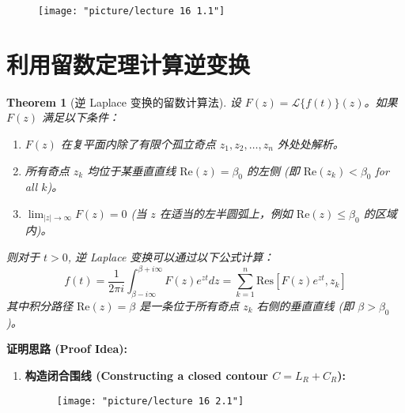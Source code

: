 \documentclass[linespread=1.5,openany]{book}%
\def\diff{d}%
\theoremstyle{plain}
\newtheorem{theorem}{Theorem}
\newcommand{\diff}{\mathop{}\!\mathrm{d}}  %
\begin{document}
{{{{{{{									\begin{figure}[h]
										\centering
										\texttt{[image: "picture/lecture 16 1.1"]}
										\caption{}
										\label{fig:lecture-16-1.1}
									\end{figure}
									
									
									
								} %
								
								
								
								
								
								
								\section{利用留数定理计算逆变换}
								{ %
									\begin{theorem}[逆 Laplace 变换的留数计算法] \label{thm:L16_inverse_laplace_residue_revised}
										设 $F(z) = \mathcal{L}\{f(t)\}(z)$。如果 $F(z)$ 满足以下条件：
										\begin{enumerate}
											\item $F(z)$ 在复平面内除了有限个孤立奇点 $z_1, z_2, \dots, z_n$ 外处处解析。
											\item 所有奇点 $z_k$ 均位于某垂直直线 $\text{Re}(z) = \beta_0$ 的左侧 (即 $\text{Re}(z_k) < \beta_0$ for all $k$)。
											\item $\lim_{|z|\to\infty} F(z) = 0$ (当 $z$ 在适当的左半圆弧上，例如 $\text{Re}(z) \le \beta_0$ 的区域内)。
										\end{enumerate}
										则对于 $t>0$, 逆 Laplace 变换可以通过以下公式计算：
										\[ f(t) = \frac{1}{2\pi i} \int_{\beta-i\infty}^{\beta+i\infty} F(z)e^{zt} \diff z = \sum_{k=1}^{n} \text{Res}\left[F(z)e^{zt},z_k\right] \]
										其中积分路径 $\text{Re}(z)=\beta$ 是一条位于所有奇点 $z_k$ 右侧的垂直直线 (即 $\beta > \beta_0$)。
									\end{theorem}
									
									\textbf{证明思路 (Proof Idea):}
									\begin{enumerate}[label=\arabic*)] %
										\item \textbf{构造闭合围线 (Constructing a closed contour $C = L_R + C_R$):}
										\begin{figure}[h]
											\centering
											\texttt{[image: "picture/lecture 16 2.1"]}
											\caption{}
											\label{fig:lecture-16-2 .1}
										\end{figure}
										

\end{enumerate}}}}}}}}
\end{document}
